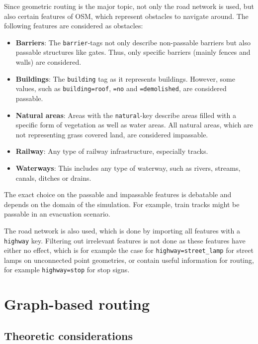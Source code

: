 			Since geometric routing is the major topic, not only the road network is used, but also certain features of OSM, which represent obstacles to navigate around.
			The following features are considered as obstacles:
			\begin{itemize}
				\item \textbf{Barriers}: The \texttt{barrier}-tags not only describe non-passable barriers but also passable structures like gates. Thus, only specific barriers (mainly fences and walls) are considered.
				\item \textbf{Buildings}: The \texttt{building} tag as it represents buildings. However, some values, such as \texttt{building=roof}, \texttt{=no} and \texttt{=demolished}, are considered passable.
				\item \textbf{Natural areas}: Areas with the \texttt{natural}-key describe areas filled with a specific form of vegetation as well as water areas. All natural areas, which are not representing grass covered land, are considered impassable.
				\item \textbf{Railway}: Any type of railway infrastructure, especially tracks.
				\item \textbf{Waterways}: This includes any type of waterway, such as rivers, streams, canals, ditches or drains.
			\end{itemize}
			The exact choice on the passable and impassable features is debatable and depends on the domain of the simulation.
			For example, train tracks might be passable in an evacuation scenario.
			
			The road network is also used, which is done by importing all features with a \texttt{highway} key.
			Filtering out irrelevant features is not done as these features have either no effect, which is for example the case for \texttt{highway=street\_lamp} for street lamps on unconnected point geometries, or contain useful information for routing, for example \texttt{highway=stop} for stop signs.

\section{Graph-based routing}
\label{sec:graph-routing}

	\subsection{Theoretic considerations}
	\label{subsec:routing-theoretic-considerations}	
	
